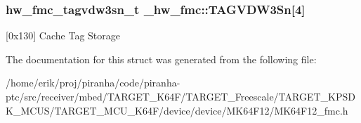 \subsubsection[{\texorpdfstring{T\+A\+G\+V\+D\+W3\+Sn}{TAGVDW3Sn}}]{ {\bf hw\+\_\+fmc\+\_\+tagvdw3sn\+\_\+t} \+\_\+hw\+\_\+fmc\+::\+T\+A\+G\+V\+D\+W3\+Sn\mbox{[}4\mbox{]}}\hypertarget{struct__hw__fmc_ae29b98f76cea13b247a66b6b016db8fc}{}\label{struct__hw__fmc_ae29b98f76cea13b247a66b6b016db8fc}
\mbox{[}0x130\mbox{]} Cache Tag Storage 

The documentation for this struct was generated from the following file\+:\begin{DoxyCompactItemize}
\item 
/home/erik/proj/piranha/code/piranha-\/ptc/src/receiver/mbed/\+T\+A\+R\+G\+E\+T\+\_\+\+K64\+F/\+T\+A\+R\+G\+E\+T\+\_\+\+Freescale/\+T\+A\+R\+G\+E\+T\+\_\+\+K\+P\+S\+D\+K\+\_\+\+M\+C\+U\+S/\+T\+A\+R\+G\+E\+T\+\_\+\+M\+C\+U\+\_\+\+K64\+F/device/device/\+M\+K64\+F12/M\+K64\+F12\+\_\+fmc.\+h\end{DoxyCompactItemize}
